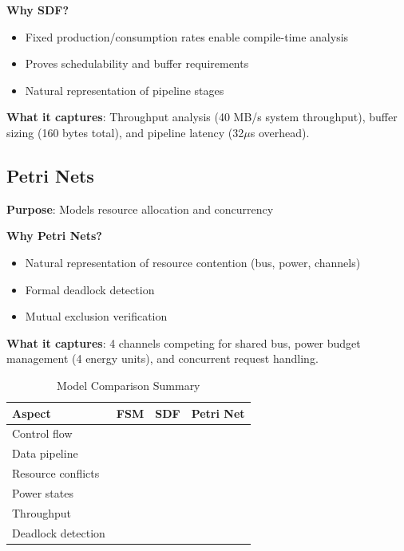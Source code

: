\documentclass[conference]{IEEEtran}
\newcommand{\cmark}{\ding{51}}%
\newcommand{\xmark}{\ding{55}}%
\begin{document}
\textbf{Why SDF?}
\begin{itemize}
    \item Fixed production/consumption rates enable compile-time analysis
    \item Proves schedulability and buffer requirements
    \item Natural representation of pipeline stages
\end{itemize}

\textbf{What it captures}: Throughput analysis (40 MB/s system throughput), buffer sizing (160 bytes total), and pipeline latency (32$\mu$s overhead).

\subsection{Petri Nets}
\textbf{Purpose}: Models resource allocation and concurrency

\textbf{Why Petri Nets?}
\begin{itemize}
    \item Natural representation of resource contention (bus, power, channels)
    \item Formal deadlock detection
    \item Mutual exclusion verification
\end{itemize}

\textbf{What it captures}: 4 channels competing for shared bus, power budget management (4 energy units), and concurrent request handling.

\begin{table}[h]
\centering
\caption{Model Comparison Summary}
\label{tab:model_comparison}
\begin{tabular}{lccc}
\toprule
\textbf{Aspect} & \textbf{FSM} & \textbf{SDF} & \textbf{Petri Net} \\
\midrule
Control flow & \cmark\cmark\cmark & \xmark & \cmark \\
Data pipeline & \xmark & \cmark\cmark\cmark & \xmark \\
Resource conflicts & \xmark & \xmark & \cmark\cmark\cmark \\
Power states & \cmark\cmark\cmark & \xmark & \cmark\cmark \\
Throughput & \xmark & \cmark\cmark\cmark & \xmark \\
Deadlock detection & \xmark & \cmark & \cmark\cmark\cmark \\
\bottomrule
\end{tabular}
\end{table}
\end{document}
